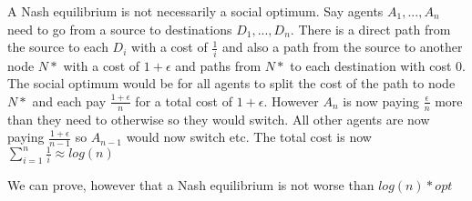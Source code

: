 \documentclass[a4paper]{article}
\begin{document}
A Nash equilibrium is not necessarily a social optimum. Say agents $A_1, ..., A_n$ need to go from a source to destinations $D_1, ..., D_n$. There is a direct path from the source to each $D_i$ with a cost of $\frac{1}{i}$ and also a path from the source to another node $N*$ with a cost of $1+\epsilon$ and paths from $N*$ to each destination with cost 0. The social optimum would be for all agents to split the cost of the path to node $N*$ and each pay $\frac{1+\epsilon}{n}$ for a total cost of $1+\epsilon$. However $A_n$ is now paying $\frac{\epsilon}{n}$ more than they need to otherwise so they would switch. All other agents are now paying $\frac{1+\epsilon}{n-1}$ so $A_{n-1}$ would now switch etc. The total cost is now $\sum\limits_{i=1}^{n}\frac{1}{i} \approx log(n)$

We can prove, however that a Nash equilibrium is not worse than $log(n)*opt$
	
\end{document}
